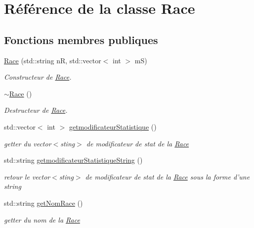 \hypertarget{classRace}{\section{Référence de la classe Race}
\label{classRace}
}
\subsection*{Fonctions membres publiques}
\begin{DoxyCompactItemize}
\item 
\hyperlink{classRace_a1e548f6c42d50d34300dba2cf49c7213}{Race} (std\-::string n\-R, std\-::vector$<$ int $>$ m\-S)
\begin{DoxyCompactList}\small\item\em Constructeur de \hyperlink{classRace}{Race}. \end{DoxyCompactList}\item 
\hypertarget{classRace_ad6bfb0bc96485e23b3bf45d794b5b536}{\hyperlink{classRace_ad6bfb0bc96485e23b3bf45d794b5b536}{$\sim$\-Race} ()}\label{classRace_ad6bfb0bc96485e23b3bf45d794b5b536}

\begin{DoxyCompactList}\small\item\em Destructeur de \hyperlink{classRace}{Race}. \end{DoxyCompactList}\item 
std\-::vector$<$ int $>$ \hyperlink{classRace_a7f37cf16b2eaaca794a77d573952fbfc}{getmodificateur\-Statistique} ()
\begin{DoxyCompactList}\small\item\em getter du vector$<$sting$>$ de modificateur de stat de la \hyperlink{classRace}{Race} \end{DoxyCompactList}\item 
std\-::string \hyperlink{classRace_aa5ff2e9b3f7208508da1263fb862d1c0}{getmodificateur\-Statistique\-String} ()
\begin{DoxyCompactList}\small\item\em retour le vector$<$sting$>$ de modificateur de stat de la \hyperlink{classRace}{Race} sous la forme d'une string \end{DoxyCompactList}\item 
std\-::string \hyperlink{classRace_afb43932eb39516f1d199843edd2999df}{get\-Nom\-Race} ()
\begin{DoxyCompactList}\small\item\em getter du nom de la \hyperlink{classRace}{Race} \end{DoxyCompactList}\end{DoxyCompactItemize}


